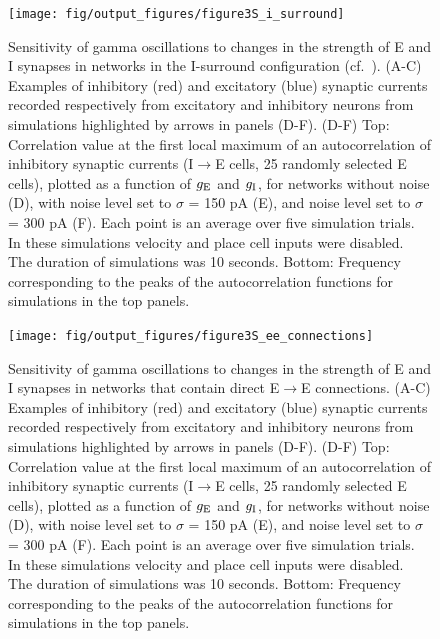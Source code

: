 \documentclass[a4paper,12pt]{article}
\newcommand{\ssc}[3]{\ensuremath{#1_{\text{#2}_{\text{#3}}}}}
\newcommand{\gE      }{\ssc{g}      {\scriptsize{E}}{}}
\newcommand{\gI      }{\ssc{g}      {\scriptsize{I}}{}}
\begin{document}
\clearpage

\begin{figure}[p]
    \internallinenumbers
    \centering
        \texttt{[image: fig/output\_figures/figure3S\_i\_surround]}
\end{figure}

\clearpage

\begin{figure}[H]
    \internallinenumbers
    \caption{Sensitivity of gamma oscillations to changes in the strength of E
    and I synapses in networks in the I-surround configuration (cf.\
    \cite{Pastoll:2013ff}).  (A-C) Examples of inhibitory (red) and excitatory
    (blue) synaptic currents recorded respectively from excitatory and
    inhibitory neurons from simulations highlighted by arrows in panels (D-F).
    (D-F) Top: Correlation value at the first local maximum of an
    autocorrelation of inhibitory synaptic currents (I$\rightarrow$E cells, 25
    randomly selected E cells), plotted as a function of $\gE$ and $\gI$, for
    networks without noise (D), with noise level set to $\sigma$ = 150 pA (E),
    and noise level set to $\sigma$ = 300 pA (F). Each point is an average over
    five simulation trials. In these simulations velocity and place cell inputs
    were disabled.  The duration of simulations was 10 seconds.  Bottom:
    Frequency corresponding to the peaks of the autocorrelation functions for
    simulations in the top panels.}
\end{figure}

\clearpage

\begin{figure}[p]
    \internallinenumbers
    \centering
        \texttt{[image: fig/output\_figures/figure3S\_ee\_connections]}
\end{figure}

\clearpage

\begin{figure}[H]
    \internallinenumbers
    \caption{Sensitivity of gamma oscillations to changes in the strength of E
    and I synapses in networks that contain direct E$\rightarrow$E connections.
    (A-C) Examples of inhibitory (red) and excitatory (blue) synaptic currents
    recorded respectively from excitatory and inhibitory neurons from
    simulations highlighted by arrows in panels (D-F).  (D-F) Top: Correlation
    value at the first local maximum of an autocorrelation of inhibitory
    synaptic currents (I$\rightarrow$E cells, 25 randomly selected E cells),
    plotted as a function of $\gE$ and $\gI$, for networks without noise (D), with
    noise level set to $\sigma$ = 150 pA (E), and noise level set to $\sigma$ =
    300 pA (F). Each point is an average over five simulation trials. In these
    simulations velocity and place cell inputs were disabled.  The duration of
    simulations was 10 seconds.  Bottom: Frequency corresponding to the peaks
    of the autocorrelation functions for simulations in the top panels.}
\end{figure}
\end{document}
